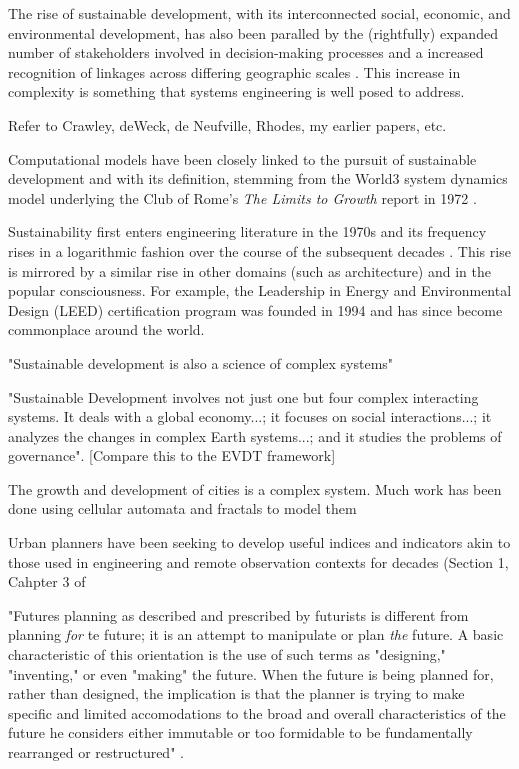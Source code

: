The rise of sustainable development, with its interconnected social, economic, and environmental development, has also been paralled by the (rightfully) expanded number of stakeholders involved in decision-making processes and a increased recognition of linkages across differing geographic scales \cite{brommelstroetPlanningSupportSystems2010}. This increase in complexity is something that systems engineering is well posed to address.

Refer to Crawley, deWeck, de Neufville, Rhodes, my earlier papers, etc.


Computational models have been closely linked to the pursuit of sustainable development and with its definition, stemming from the World3 system dynamics model underlying the Club of Rome's \textit{The Limits to Growth} report in 1972 \cite{meadowsLimitsGrowth1972}.

Sustainability first enters engineering literature in the 1970s and its frequency rises in a logarithmic fashion over the course of the subsequent decades \cite{deweckInvestigatingRelationshipsSemantic2012}. This rise is mirrored by a similar rise in other domains (such as architecture) and in the popular consciousness. For example, the Leadership in Energy and Environmental Design (LEED) certification program was founded in 1994 and has since become commonplace around the world.

"Sustainable development is also a science of complex systems" \cite{sachsAgeSustainableDevelopment2015}

"Sustainable Development involves not just one but four complex interacting systems. It deals with a global economy...; it focuses on social interactions...; it analyzes the changes in complex Earth systems...; and it studies the problems of governance". \cite{sachsAgeSustainableDevelopment2015} [Compare this to the EVDT framework]

The growth and development of cities is a complex system. Much work has been done using cellular automata and fractals to model them \cite{battyCitiesComplexity2005}

Urban planners have been seeking to develop useful indices and indicators akin to those used in engineering and remote observation contexts for decades (Section 1, Cahpter 3 of \cite{boyceFrameworkDefiningApplying1972}


"Futures planning as described and prescribed by futurists is different from planning \textit{for} te future; it is an attempt to manipulate or plan \textit{the} future. A basic characteristic of this orientation is the use of such terms as "designing," "inventing," or even "making" the future. When the future is being planned for, rather than designed, the implication is that the planner is trying to make specific and limited accomodations to the broad and overall characteristics of the future he considers either immutable or too formidable to be fundamentally rearranged or restructured" \cite{robinsonDecisionmakingUrbanPlanning1972}.

